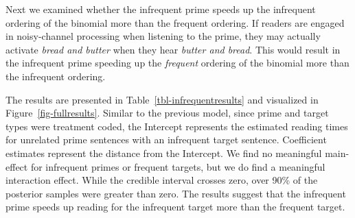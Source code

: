 \documentclass[
  12pt,
]{scrartcl}
\begin{document}
\begin{table}

\caption{\label{tbl-frequentresults}Results of the statistical model for
the frequent vs unrelated prime.}


\end{table}%

Next we examined whether the infrequent prime speeds up the infrequent
ordering of the binomial more than the frequent ordering. If readers are
engaged in noisy-channel processing when listening to the prime, they
may actually activate \emph{bread and butter} when they hear
\emph{butter and bread}. This would result in the infrequent prime
speeding up the \emph{frequent} ordering of the binomial more than the
infrequent ordering.

The results are presented in Table~\ref{tbl-infrequentresults} and
visualized in Figure~\ref{fig-fullresults}. Similar to the previous
model, since prime and target types were treatment coded, the Intercept
represents the estimated reading times for unrelated prime sentences
with an infrequent target sentence. Coefficient estimates represent the
distance from the Intercept. We find no meaningful main-effect for
infrequent primes or frequent targets, but we do find a meaningful
interaction effect. While the credible interval crosses zero, over 90\%
of the posterior samples were greater than zero. The results suggest
that the infrequent prime speeds up reading for the infrequent target
more than the frequent target.
\end{document}
